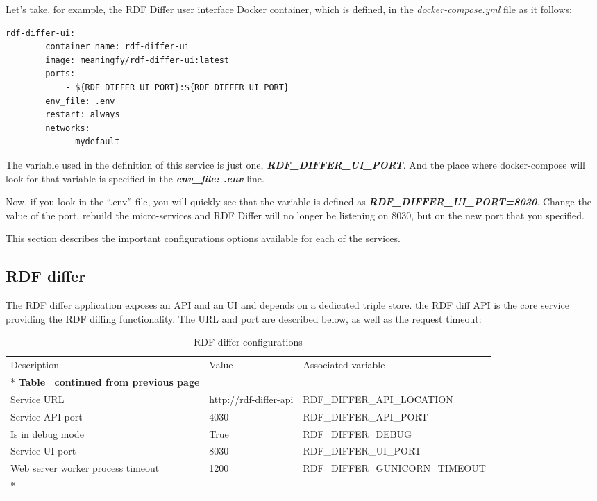     
    Let’s take, for example, the RDF Differ user interface Docker container, which is defined, in the \textit{docker-compose.yml} file as it follows:
\begin{lstlisting}[]
    rdf-differ-ui:
    	container_name: rdf-differ-ui
    	image: meaningfy/rdf-differ-ui:latest
    	ports:
    		- ${RDF_DIFFER_UI_PORT}:${RDF_DIFFER_UI_PORT}
    	env_file: .env
    	restart: always
    	networks:
    		- mydefault
\end{lstlisting}
    The variable used in the definition of this service is just one, \textbf{\textit{RDF\_DIFFER\_UI\_PORT}}. And the place where docker-compose will look for that variable is specified in the \textbf{\textit{env\_file: .env}} line.
    
    Now, if you look in the “.env” file, you will quickly see that the variable is defined as \textbf{\textit{RDF\_DIFFER\_UI\_PORT=8030}}. Change the value of the port, rebuild the micro-services and RDF Differ will no longer be listening on 8030, but on the new port that you specified.
    
    
    This section describes the important configurations options available for each of the services.
	
	\subsection{RDF differ}
	
	The RDF differ application exposes an API and an UI and depends on a dedicated triple store. the RDF diff API is the core service providing the RDF diffing functionality. The URL and port are described below, as well as the request timeout:
	
	\begin{longtable}[c]{@{}p{3.5cm}p{3.5cm}l@{}}
		\toprule
		Description & Value & Associated variable \\* \midrule
		\endfirsthead
		\multicolumn{3}{c}%
		{{\bfseries Table \thetable\ continued from previous page}} \\
		\endhead
		\bottomrule
		\endfoot
		\endlastfoot
		Service URL & http://rdf-differ-api & RDF\_DIFFER\_API\_LOCATION \\
		Service API port & 4030 & RDF\_DIFFER\_API\_PORT \\
		Is in debug mode & True & RDF\_DIFFER\_DEBUG \\
		Service UI port & 8030 & RDF\_DIFFER\_UI\_PORT \\
		Web server worker process timeout & 1200 & RDF\_DIFFER\_GUNICORN\_TIMEOUT \\* \bottomrule
		\caption{RDF differ configurations}
		\label{tab:my-table1}\\
	\end{longtable}

